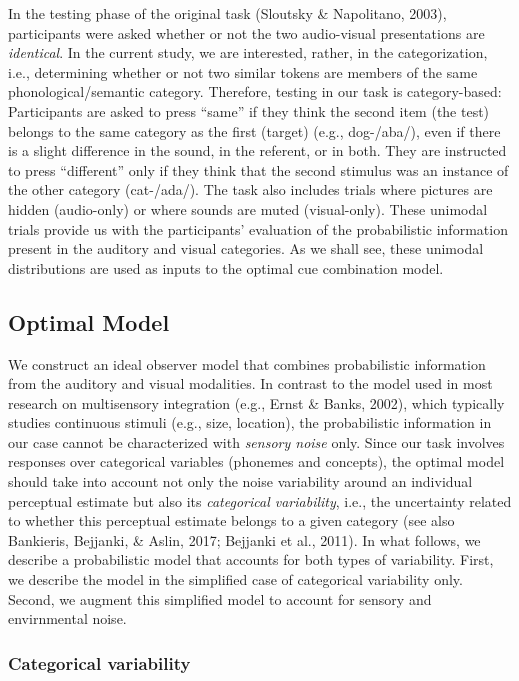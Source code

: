 \documentclass[english,,man,floatsintext]{apa6}
\theoremstyle{definition}
\theoremstyle{definition}
\theoremstyle{definition}
\theoremstyle{remark}
\begin{document}
In the testing phase of the original task (Sloutsky \& Napolitano,
2003), participants were asked whether or not the two audio-visual
presentations are \emph{identical}. In the current study, we are
interested, rather, in the categorization, i.e., determining whether or
not two similar tokens are members of the same phonological/semantic
category. Therefore, testing in our task is category-based: Participants
are asked to press \enquote{same} if they think the second item (the
test) belongs to the same category as the first (target) (e.g.,
dog-/aba/), even if there is a slight difference in the sound, in the
referent, or in both. They are instructed to press \enquote{different}
only if they think that the second stimulus was an instance of the other
category (cat-/ada/). The task also includes trials where pictures are
hidden (audio-only) or where sounds are muted (visual-only). These
unimodal trials provide us with the participants' evaluation of the
probabilistic information present in the auditory and visual categories.
As we shall see, these unimodal distributions are used as inputs to the
optimal cue combination model.

\subsection{Optimal Model}\label{optimal-model}

We construct an ideal observer model that combines probabilistic
information from the auditory and visual modalities. In contrast to the
model used in most research on multisensory integration (e.g., Ernst \&
Banks, 2002), which typically studies continuous stimuli (e.g., size,
location), the probabilistic information in our case cannot be
characterized with \emph{sensory noise} only. Since our task involves
responses over categorical variables (phonemes and concepts), the
optimal model should take into account not only the noise variability
around an individual perceptual estimate but also its \emph{categorical
variability}, i.e., the uncertainty related to whether this perceptual
estimate belongs to a given category (see also Bankieris, Bejjanki, \&
Aslin, 2017; Bejjanki et al., 2011). In what follows, we describe a
probabilistic model that accounts for both types of variability. First,
we describe the model in the simplified case of categorical variability
only. Second, we augment this simplified model to account for sensory
and envirnmental noise.

\subsubsection{Categorical variability}\label{categorical-variability}
\end{document}
